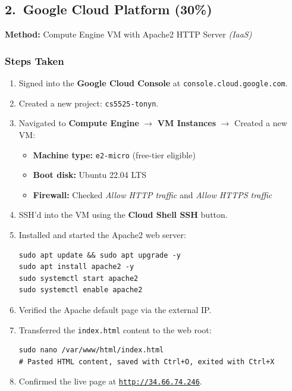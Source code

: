 \documentclass[12pt,letterpaper]{article}
\begin{document}
\subsection{2.\ Google Cloud Platform (30\%)}

\textbf{Method:} Compute Engine VM with Apache2 HTTP Server \textit{(IaaS)}

\subsubsection{Steps Taken}

\begin{enumerate}
  \item Signed into the \textbf{Google Cloud Console} at
        \texttt{console.cloud.google.com}.
  \item Created a new project: \texttt{cs5525-tonyn}.
  \item Navigated to \textbf{Compute Engine} $\to$ \textbf{VM Instances} $\to$
        Created a new VM:
        \begin{itemize}
          \item \textbf{Machine type:} \texttt{e2-micro} (free-tier eligible)
          \item \textbf{Boot disk:} Ubuntu 22.04 LTS
          \item \textbf{Firewall:} Checked \textit{Allow HTTP traffic} and
                \textit{Allow HTTPS traffic}
        \end{itemize}
  \item SSH'd into the VM using the \textbf{Cloud Shell SSH} button.
  \item Installed and started the Apache2 web server:

\begin{lstlisting}[style=bashStyle]
sudo apt update && sudo apt upgrade -y
sudo apt install apache2 -y
sudo systemctl start apache2
sudo systemctl enable apache2
\end{lstlisting}

  \item Verified the Apache default page via the external IP.
  \item Transferred the \texttt{index.html} content to the web root:

\begin{lstlisting}[style=bashStyle]
sudo nano /var/www/html/index.html
# Pasted HTML content, saved with Ctrl+O, exited with Ctrl+X
\end{lstlisting}

  \item Confirmed the live page at \href{http://34.66.74.246}{\texttt{http://34.66.74.246}}.
\end{enumerate}
\end{document}

